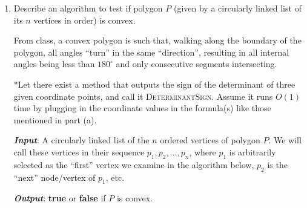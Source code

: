 \documentclass [12pt]{article}
\begin{document}
\begin{enumerate}[label=(\alph*)]
            \pagebreak



            \item Describe an algorithm to test if polygon $P$ (given by a circularly linked list of its $n$ vertices in order) is convex. 
            
            From class, a convex polygon is such that, walking along the boundary of the polygon, all angles ``turn'' in the same ``direction'', resulting in all internal angles being less than $180^\circ$ and only consecutive segments intersecting.
            
            *Let there exist a method that outputs the sign of the determinant of three given coordinate points, and call it \textsc{DeterminantSign}. Assume it runs $O(1)$ time by plugging in the coordinate values in the formula(s) like those mentioned in part (a).
             
            \emph{\textbf{Input}}: A circularly linked list of the $n$ ordered vertices of polygon $P$. We will call these vertices in their sequence $p_1, p_2, ..., p_n$, where $p_1$ is arbitrarily selected as the ``first'' vertex we examine in the algorithm below, $p_2$ is the ``next'' node/vertex of $p_1$, etc.

            \emph{\textbf{Output}}: \textbf{true} or \textbf{false} if $P$ is convex.


\end{enumerate}
\end{document}
